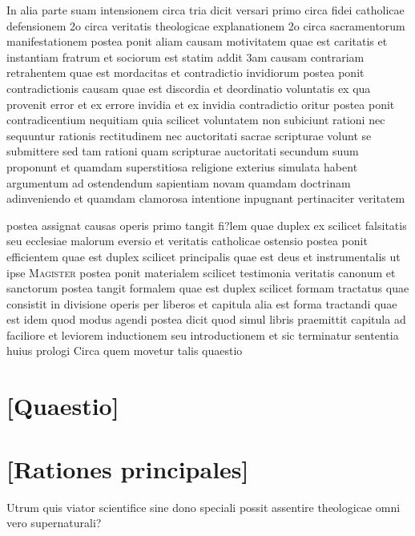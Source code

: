 \documentclass[twoside, openright]{article}
\newcommand{\name}[1]{\textsc{#1}}
\begin{document}
        \pstart
        In alia parte suam intensionem circa tria dicit versari primo circa fidei catholicae defensionem 2o circa veritatis theologicae explanationem 2o circa sacramentorum manifestationem postea ponit aliam causam motivitatem quae est caritatis et instantiam fratrum et sociorum est statim addit 3am causam contrariam retrahentem quae est mordacitas et contradictio invidiorum postea ponit contradictionis causam quae est discordia et deordinatio voluntatis ex qua provenit error et ex errore invidia et ex invidia contradictio oritur postea ponit contradicentium nequitiam quia scilicet voluntatem non subiciunt rationi nec sequuntur rationis rectitudinem nec auctoritati sacrae scripturae volunt se submittere sed tam rationi quam scripturae auctoritati secundum suum proponunt et quamdam superstitiosa religione exterius simulata habent argumentum ad ostendendum sapientiam novam quamdam doctrinam adinveniendo et quamdam clamorosa intentione inpugnant pertinaciter veritatem
        \pend
     
        \pstart
        postea assignat causas operis primo tangit fi?lem quae duplex ex scilicet falsitatis seu ecclesiae malorum eversio et veritatis catholicae ostensio postea ponit efficientem quae est duplex scilicet principalis quae est deus et instrumentalis ut ipse \name{Magister} postea ponit materialem scilicet testimonia veritatis canonum et sanctorum postea tangit formalem quae est duplex scilicet formam tractatus quae consistit in divisione operis per liberos et capitula alia est forma tractandi quae est idem quod modus agendi postea dicit quod simul libris praemittit capitula ad faciliore et leviorem inductionem seu introductionem et sic terminatur sententia huius prologi Circa quem movetur talis quaestio
        \pend
      
        \bigskip
         \section*{[Quaestio]} 
        \bigskip
         \section*{[Rationes principales]} 
        \pstart
        Utrum quis viator scientifice sine dono speciali possit assentire theologicae omni vero supernaturali?
        \pend
     
\end{document}
